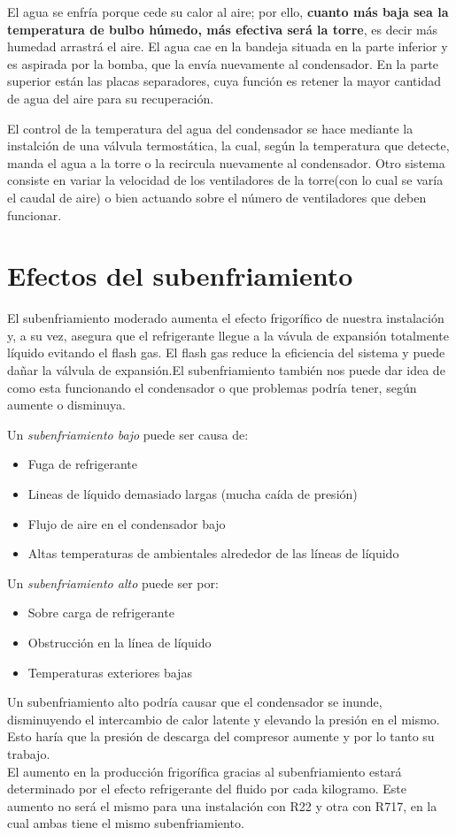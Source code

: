 El agua se enfr\'ia porque cede su calor al aire; por ello, \textbf{cuanto m\'as baja sea la temperatura de bulbo h\'umedo, m\'as efectiva ser\'a la torre}, es decir m\'as humedad arrastr\'a el aire. El agua cae en la bandeja situada en la parte inferior y es aspirada por la bomba, que la env\'ia nuevamente al condensador. En la parte superior est\'an las placas separadores, cuya funci\'on es retener la mayor cantidad de agua del aire para su recuperaci\'on.

El control de la temperatura del agua del condensador se hace mediante la instalci\'on de una v\'alvula termost\'atica, la cual, seg\'un la temperatura que detecte, manda el agua a la torre o la recircula nuevamente al condensador. Otro sistema consiste en variar la velocidad de los ventiladores de la torre(con lo cual se var\'ia el caudal de aire) o bien actuando sobre el n\'umero de ventiladores que deben funcionar.

\section{Efectos del subenfriamiento}

El subenfriamiento moderado aumenta el efecto frigor\'ifico de nuestra instalaci\'on y, a su vez, asegura que el refrigerante llegue a la v\'avula de expansi\'on totalmente l\'iquido evitando el flash gas. El flash gas reduce la eficiencia del sistema y puede da\~{n}ar la v\'alvula de expansi\'on.El subenfriamiento tambi\'en nos puede dar idea de como esta funcionando el condensador o que problemas podr\'ia tener, seg\'un aumente o disminuya.

Un \emph{subenfriamiento bajo} puede ser causa de:
\begin{itemize}
    \item Fuga de refrigerante
    \item Lineas de l\'iquido demasiado largas (mucha ca\'ida de presi\'on)
    \item Flujo de aire en el condensador bajo
    \item Altas temperaturas de ambientales alrededor de las l\'ineas de l\'iquido
\end{itemize}
Un \emph{subenfriamiento alto} puede ser por:
\begin{itemize}
    \item Sobre carga de refrigerante
    \item Obstrucci\'on en la l\'inea de l\'iquido
    \item Temperaturas exteriores bajas
\end{itemize}
Un subenfriamiento alto podr\'ia causar que el condensador se inunde, disminuyendo el intercambio de calor latente y elevando la presi\'on en el mismo. Esto har\'ia que la presi\'on de descarga del compresor aumente y por lo tanto su trabajo.\\El aumento en la producci\'on frigor\'ifica gracias al subenfriamiento estar\'a determinado por el efecto refrigerante del fluido por cada kilogramo. Este aumento no ser\'a el mismo para una instalaci\'on con R22 y otra con R717, en la cual ambas tiene el mismo subenfriamiento.

